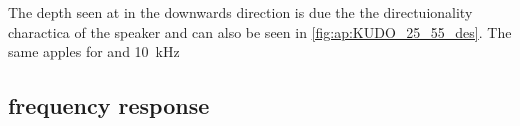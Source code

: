 
The depth seen at  in the downwards direction is due the the directuionality charactica of the speaker and can also be seen in \autoref{fig:ap:KUDO_25_55_des}. The same apples for  and \SI{10}{\kilo\hertz}



\subsection{frequency response}






